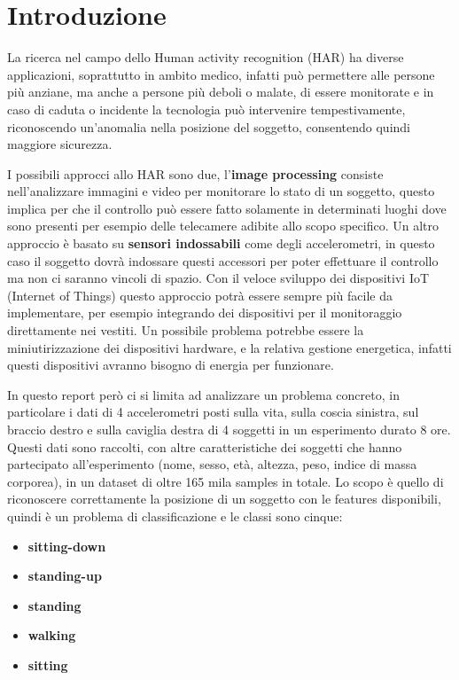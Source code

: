 \section{Introduzione}\label{sec:introduzione}
La ricerca nel campo dello Human activity recognition (HAR) ha diverse applicazioni, soprattutto in ambito medico, infatti può permettere alle persone più anziane, ma anche a persone più deboli o malate, di essere monitorate e in caso di caduta o incidente la tecnologia può intervenire tempestivamente, riconoscendo un'anomalia nella posizione del soggetto, consentendo quindi maggiore sicurezza.  

I possibili approcci allo HAR sono due, l'\textbf{image processing} consiste nell'analizzare immagini e video per monitorare lo stato di un soggetto, questo implica per che il controllo può essere fatto solamente in determinati luoghi dove sono presenti per esempio delle telecamere adibite allo scopo specifico. Un altro approccio è basato su \textbf{sensori indossabili} come degli accelerometri, in questo caso il soggetto dovrà indossare questi accessori per poter effettuare il controllo ma non ci saranno vincoli di spazio.  Con il veloce sviluppo dei dispositivi IoT (Internet of Things) questo approccio potrà essere sempre più facile da implementare, per esempio integrando dei dispositivi per il monitoraggio direttamente nei vestiti. Un possibile problema potrebbe essere la miniutirizzazione dei dispositivi hardware, e la relativa gestione energetica, infatti questi dispositivi avranno bisogno di energia per funzionare.

In questo report però ci si limita ad analizzare un problema concreto, in particolare i dati di 4 accelerometri posti sulla vita, sulla coscia sinistra, sul braccio destro e sulla caviglia destra di 4 soggetti in un esperimento durato 8 ore.  Questi dati sono raccolti, con altre caratteristiche dei soggetti che hanno partecipato all'esperimento (nome, sesso, età, altezza, peso, indice di massa corporea), in un dataset di oltre 165 mila samples in totale. Lo scopo è quello di riconoscere correttamente la posizione di un soggetto con le features disponibili, quindi è un problema di classificazione e le classi sono cinque:
\begin{itemize}
\item \textbf{sitting-down}
\item \textbf{standing-up}
\item \textbf{standing}
\item \textbf{walking}
\item \textbf{sitting}
\end{itemize}

